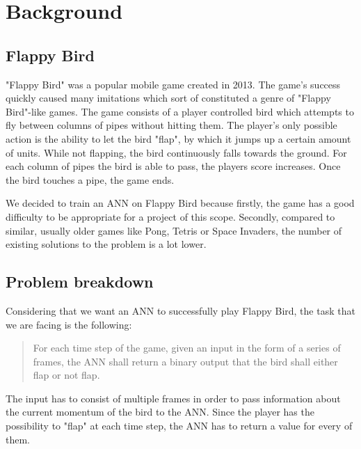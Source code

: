 \section{Background}
\subsection{Flappy Bird}
"Flappy Bird" was a popular mobile game created in 2013. The game's success quickly caused many imitations which sort of constituted a genre of "Flappy Bird"-like games. The game consists of a player controlled bird which attempts to fly between columns of pipes without hitting them. The player's only possible action is the ability to let the bird "flap", by which it jumps up a certain amount of units. While not flapping, the bird continuously falls towards the ground. For each column of pipes the bird is able to pass, the players score increases. Once the bird touches a pipe, the game ends.
\par
We decided to train an ANN on Flappy Bird because firstly, the game has a good difficulty to be appropriate for a project of this scope. Secondly, compared to similar, usually older games like Pong, Tetris or Space Invaders, the number of existing solutions to the problem is a lot lower.

\subsection{Problem breakdown}
Considering that we want an ANN to successfully play Flappy Bird, the task that we are facing is the following: 
\begin{quote}
For each time step of the game, given an input in the form of a series of frames, the ANN shall return a binary output that the bird shall either flap or not flap.
\end{quote}

The input has to consist of multiple frames in order to pass information about the current momentum of the bird to the ANN. Since the player has the possibility to "flap" at each time step, the ANN has to return a value for every of them.

